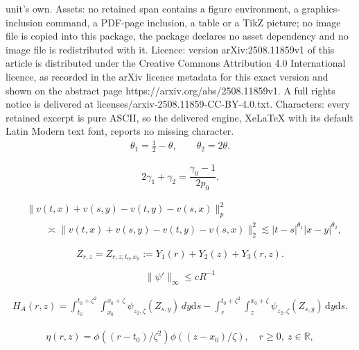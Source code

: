 \documentclass[10pt,a4paper]{amsart}
\newcommand {\deltah}{{\zeta}}
\newcommand{\R}{{\mathbb{R}}}
\renewcommand{\d}{\mathrm{d}}
\begin{document}
unit's own. Assets: no retained span contains a figure environment, a graphics-inclusion command, a PDF-page inclusion, a table or a TikZ picture; no image file is copied into this package, the package declares no asset dependency and no image file is redistributed with it. Licence: version arXiv:2508.11859v1 of this article is distributed under the Creative Commons Attribution 4.0 International licence, as recorded in the arXiv licence metadata for this exact version and shown on the abstract page https://arxiv.org/abs/2508.11859v1. A full rights notice is delivered at licenses/arxiv-2508.11859-CC-BY-4.0.txt. Characters: every retained excerpt is pure ASCII, so the delivered engine, XeLaTeX with its default Latin Modern text font, reports no missing character.
\begin{align}\label{eq:theta12}
\theta_1=\frac 12-\theta, \qquad \theta_2=2\theta.
\end{align}

\begin{equation}\label{rd07_01e1}
2\gamma_1+\gamma_2=\frac {\gamma_0-1}{2p_0}.
\end{equation}

\begin{align}\label{eq:rectangle}
&\|v(t,x)+v(s,y)-v(t,y)-v(s,x)\|_p^2 \nonumber\\
&\qquad \asymp \|v(t,x)+v(s,y)-v(t,y)-v(s,x)\|_2^2 \lesssim |t-s|^{\theta_1}|x-y|^{\theta_2},
\end{align}

 \begin{equation}\label{rd04_04e1}
 Z_{r,z} = Z_{r, z; t_0, x_0} :=  Y_1(r) + Y_2(z) + Y_3(r,z).
 \end{equation}

 \begin{equation}\label{rd07_02e1}
    \|\psi'\|_\infty \le cR^{-1}
\end{equation}

 \begin{align}\label{eq:H}
 H_A(r,z)= \int_{t_0}^{t_0+\deltah^2}\int_{x_0}^{x_0+\deltah}\psi_{z_2, \deltah}(Z_{s,y})\, d y\d s- \int_{r}^{t_0+\deltah^2}\int_{z}^{x_0+\deltah}\psi_{z_2, \deltah}(Z_{s,y})\, \d y\d s. 
 \end{align}

\begin{align}\label{eq:eta}
\eta(r, z)= \phi\left((r-t_0)/\deltah^2\right) \phi\left((z-x_0)/\deltah\right), \quad r\geq0,\ z\in \R,
\end{align}
\end{document}
